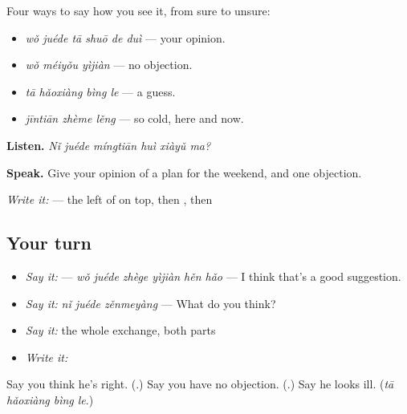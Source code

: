 \begin{grammarlens}[title={What you've built — giving an opinion}]
Four ways to say how you see it, from sure to unsure:

\begin{itemize}
\raggedright
  \item \textbf{} \emph{wǒ juéde tā shuō de duì} — your opinion.
  \item \textbf{} \emph{wǒ méiyǒu yìjiàn} — no objection.
  \item \emph{tā hǎoxiàng bìng le} — a guess.
  \item \textbf{} \emph{jīntiān zhème lěng} — so cold, here and now.
\end{itemize}

\textbf{Listen.} \emph{Nǐ juéde míngtiān huì xiàyǔ ma?}

\textbf{Speak.} Give your opinion of a plan for the weekend, and one objection.

\emph{Write it:}  — the left of  on top, then , then 
\end{grammarlens}

\subsection*{Your turn}
\begin{itemize}
\raggedright
  \item \emph{Say it:}  — \emph{wǒ juéde zhège yìjiàn hěn hǎo} — I think that's a good suggestion.
  \item \emph{Say it:} \emph{nǐ juéde zěnmeyàng} — What do you think?
  \item \emph{Say it:} the whole exchange, both parts
  \item \emph{Write it:} 
\end{itemize}

\begin{tcolorbox}[breakable,colback=teal!4,colframe=teal!35!black,title={Before you move on}]
Say you think he's right. (\textbf{}.) Say you have no objection. (\textbf{}.) Say he looks ill. (\emph{tā hǎoxiàng bìng le}.)
\end{tcolorbox}
